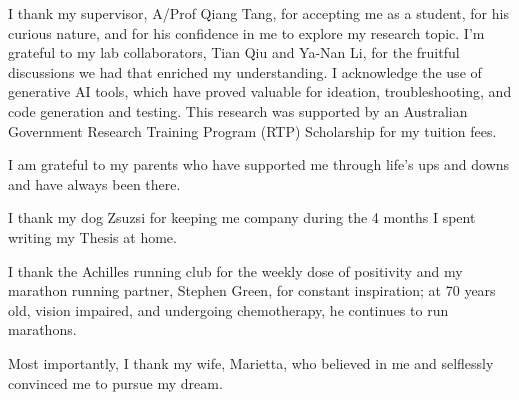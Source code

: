 I thank my supervisor, A/Prof Qiang Tang, for accepting me as a student, for his curious nature, and for his confidence in me to explore my research topic. I'm grateful to my lab collaborators, Tian Qiu and Ya-Nan Li, for the fruitful discussions we had that enriched my understanding. I acknowledge the use of generative AI tools, which have proved valuable for ideation, troubleshooting, and code generation and testing. This research was supported by an Australian Government Research Training Program (RTP) Scholarship for my tuition fees.

I am grateful to my parents who have supported me through life's ups and downs and have always been there.

I thank my dog Zsuzsi for keeping me company during the 4 months I spent writing my Thesis at home. 

I thank the Achilles running club for the weekly dose of positivity and my marathon running partner, Stephen Green, for constant inspiration; at 70 years old, vision impaired, and undergoing chemotherapy, he continues to run marathons. 

Most importantly, I thank my wife, Marietta, who believed in me and selflessly convinced me to pursue my dream.